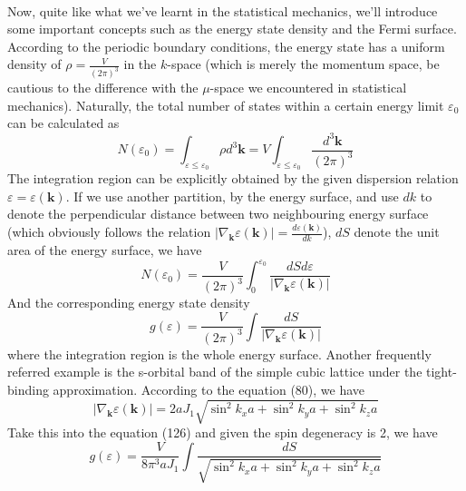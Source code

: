 \documentclass{article}
\begin{document}
\\
Now, quite like what we've learnt in the statistical mechanics, we'll introduce some important concepts such as the energy state density and the Fermi surface. According to the periodic boundary conditions, the energy state has a uniform density of $\rho=\frac{V}{(2\pi)^3}$ in the $k$-space (which is merely the momentum space, be cautious to the difference with the $\mu$-space we encountered in statistical mechanics). Naturally, the total number of states within a certain energy limit $\varepsilon_0$ can be calculated as\begin{equation}
    N(\varepsilon_0)=\int_{\varepsilon\leq\varepsilon_0}\rho{d}^3\mathbf{k}=V\int_{\varepsilon\leq\varepsilon_0}\frac{d^3\mathbf{k}}{(2\pi)^3}
\end{equation}
The integration region can be explicitly obtained by the given dispersion relation $\varepsilon=\varepsilon(\mathbf{k})$. If we use another partition, by the energy surface, and use $dk$ to denote the perpendicular distance between two neighbouring energy surface (which obviously follows the relation $|\nabla_{\mathbf{k}}\varepsilon(\mathbf{k})|=\frac{d\varepsilon(\mathbf{k})}{dk}$), $dS$ denote the unit area of the energy surface, we have\begin{equation}
    N(\varepsilon_0)=\frac{V}{(2\pi)^3}\int_0^{\varepsilon_0}\frac{dSd\varepsilon}{|\nabla_{\mathbf{k}}\varepsilon(\mathbf{k})|}
\end{equation}
And the corresponding energy state density\begin{equation}
    g(\varepsilon)=\frac{V}{(2\pi)^3}\int\frac{dS}{|\nabla_{\mathbf{k}}\varepsilon(\mathbf{k})|}
\end{equation}
where the integration region is the whole energy surface. Another frequently referred example is the s-orbital band of the simple cubic lattice under the tight-binding approximation. According to the equation (80), we have\begin{equation}
    |\nabla_{\mathbf{k}}\varepsilon(\mathbf{k})|=2aJ_1\sqrt{\sin^2k_xa+\sin^2k_ya+\sin^2k_za}
\end{equation}
Take this into the equation (126) and given the spin degeneracy is 2, we have\begin{equation}
    g(\varepsilon)=\frac{V}{8\pi^3aJ_1}\int\frac{dS}{\sqrt{\sin^2k_xa+\sin^2k_ya+\sin^2k_za}}
\end{equation}
\end{document}
